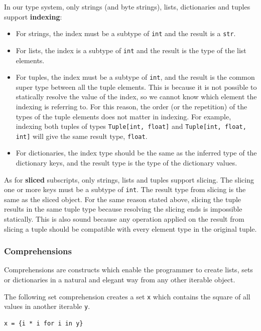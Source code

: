 In our type system, only strings (and byte strings), lists, dictionaries and tuples support \textbf{indexing}:

\begin{itemize}
	\item For strings, the index must be a subtype of \lstinline|int| and the result is a \lstinline|str|.
	\item For lists, the index is a subtype of \lstinline|int| and the result is the type of the list elements.
	\item For tuples, the index must be a subtype of \lstinline|int|, and the result is the common super type between all the tuple elements. This is because it is not possible to statically resolve the value of the index, so we cannot know which element the indexing is referring to. For this reason, the order (or the repetition) of the types of the tuple elements does not matter in indexing. For example, indexing both tuples of types \lstinline|Tuple[int, float]| and \lstinline|Tuple[int, float, int]| will give the same result type, \lstinline|float|.
	\item For dictionaries, the index type should be the same as the inferred type of the dictionary keys, and the result type is the type of the dictionary values.
\end{itemize}

As for \textbf{sliced} subscripts, only strings, lists and tuples support slicing. The slicing one or more keys must be a subtype of \lstinline|int|. The result type from slicing is the same as the sliced object. For the same reason stated above, slicing the tuple results in the same tuple type because resolving the slicing ends is impossible statically. This is also sound because any operation applied on the result from slicing a tuple should be compatible with every element type in the original tuple.

\subsubsection{Comprehensions}
Comprehensions are constructs which enable the programmer to create lists, sets or dictionaries in a natural and elegant way from any other iterable object.

The following set comprehension creates a set \lstinline|x| which contains the square of all values in another iterable \lstinline|y|.

\begin{lstlisting}
x = {i * i for i in y}
\end{lstlisting}

